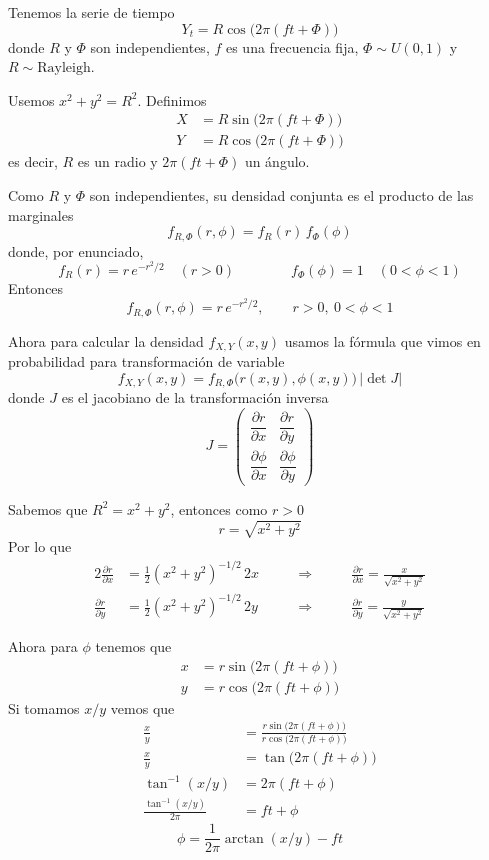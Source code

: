 \documentclass[9pt]{extarticle}
\begin{document}
Tenemos la serie de tiempo
\[
Y_t = R\cos\bigl(2\pi(ft+\Phi)\bigr)
\]
donde $R$ y $\Phi$ son independientes, $f$ es una frecuencia fija, $\Phi \sim U(0,1)$ y $R \sim \text{Rayleigh}$.

Usemos $x^2+y^2=R^2$. Definimos
\begin{align*}
X &= R\sin\bigl(2\pi(ft+\Phi)\bigr)\\
Y &= R\cos\bigl(2\pi(ft+\Phi)\bigr)
\end{align*}
es decir, $R$ es un radio y $2\pi(ft+\Phi)$ un ángulo.

Como $R$ y $\Phi$ son independientes, su densidad conjunta es el producto de las marginales
\[
f_{R,\Phi}(r,\phi) = f_R(r)\, f_\Phi(\phi)
\]
donde, por enunciado,
\[
f_R(r) = r\,e^{-r^2/2} \quad (r>0)
\qquad\qquad
f_\Phi(\phi) = 1 \quad (0<\phi<1)
\]
Entonces
\[
f_{R,\Phi}(r,\phi) = r\,e^{-r^2/2}, \qquad r>0,\ 0<\phi<1
\]

Ahora para calcular la densidad $f_{X,Y}(x,y)$ usamos la fórmula que vimos en probabilidad para transformación de variable
\[
f_{X,Y}(x,y) = f_{R,\Phi}\bigl(r(x,y),\phi(x,y)\bigr)\,\lvert \det J\rvert
\]
donde $J$ es el jacobiano de la transformación inversa
\[
J = \begin{pmatrix}
\dfrac{\partial r}{\partial x} & \dfrac{\partial r}{\partial y}\\[2ex]
\dfrac{\partial \phi}{\partial x} & \dfrac{\partial \phi}{\partial y}
\end{pmatrix}
\]

Sabemos que $R^2 = x^2+y^2$, entonces como $r>0$
\[
\boxed{r = \sqrt{x^2+y^2}}
\]
Por lo que
\begin{alignat*}{2}
\frac{\partial r}{\partial x} &= \frac{1}{2}(x^2+y^2)^{-1/2}\,2x
&\qquad\Rightarrow\qquad &\boxed{\frac{\partial r}{\partial x} = \frac{x}{\sqrt{x^2+y^2}}}\\
\frac{\partial r}{\partial y} &= \frac{1}{2}(x^2+y^2)^{-1/2}\,2y
&\qquad\Rightarrow\qquad &\boxed{\frac{\partial r}{\partial y} = \frac{y}{\sqrt{x^2+y^2}}}
\end{alignat*}

Ahora para $\phi$ tenemos que
\begin{align*}
x &= r\sin\bigl(2\pi(ft+\phi)\bigr)\\
y &= r\cos\bigl(2\pi(ft+\phi)\bigr)
\end{align*}
Si tomamos $x/y$ vemos que
\begin{align*}
\frac{x}{y} &= \frac{r\sin\bigl(2\pi(ft+\phi)\bigr)}{r\cos\bigl(2\pi(ft+\phi)\bigr)}\\
\frac{x}{y} &= \tan\bigl(2\pi(ft+\phi)\bigr)\\
\tan^{-1}(x/y) &= 2\pi(ft+\phi)\\
\frac{\tan^{-1}(x/y)}{2\pi} &= ft+\phi
\end{align*}
\[
\boxed{\phi = \frac{1}{2\pi}\arctan(x/y) - ft}
\]
\end{document}
